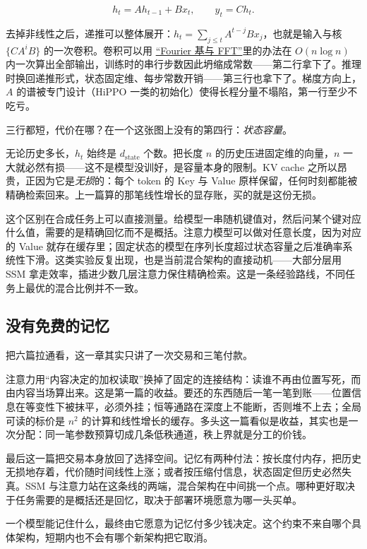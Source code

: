 \[
h_t = A h_{t-1} + B x_t,\qquad y_t = C h_t .
\]

去掉非线性之后，递推可以整体展开：\(h_t=\sum_{j\le t}A^{t-j}Bx_j\)，也就是输入与核 \(\{CA^{i}B\}\) 的一次卷积。卷积可以用 \hyperref[sec:03-Linear-Algebra/08-Complex-Matrices-and-Fourier-Structure/03]{``Fourier 基与 FFT''}里的办法在 \(O(n\log n)\) 内一次算出全部输出，训练时的串行步数因此坍缩成常数——第二行拿下了。推理时换回递推形式，状态固定维、每步常数开销——第三行也拿下了。梯度方向上，\(A\) 的谱被专门设计（HiPPO 一类的初始化）使得长程分量不塌陷，第一行至少不吃亏。

三行都短，代价在哪？在一个这张图上没有的第四行：\emph{状态容量}。

无论历史多长，\(h_t\) 始终是 \(d_{\text{state}}\) 个数。把长度 \(n\) 的历史压进固定维的向量，\(n\) 一大就必然有损——这不是模型没训好，是容量本身的限制。KV cache 之所以昂贵，正因为它是\emph{无损}的：每个 token 的 Key 与 Value 原样保留，任何时刻都能被精确检索回来。上一篇算的那笔线性增长的显存账，买的就是这份无损。

这个区别在合成任务上可以直接测量。给模型一串随机键值对，然后问某个键对应什么值，需要的是精确回忆而不是概括。注意力模型可以做对任意长度，因为对应的 Value 就存在缓存里；固定状态的模型在序列长度超过状态容量之后准确率系统性下滑。这类实验反复出现，也是当前混合架构的直接动机——大部分层用 SSM 拿走效率，插进少数几层注意力保住精确检索。这是一条经验路线，不同任务上最优的混合比例并不一致。

\subsection{没有免费的记忆}

把六篇拉通看，这一章其实只讲了一次交易和三笔付款。

注意力用``内容决定的加权读取''换掉了固定的连接结构：读谁不再由位置写死，而由内容当场算出来。这是第一篇的收益。要还的东西随后一笔一笔到账——位置信息在等变性下被抹平，必须外挂；恒等通路在深度上不能断，否则堆不上去；全局可读的标价是 \(n^2\) 的计算和线性增长的缓存。多头这一篇看似是收益，其实也是一次分配：同一笔参数预算切成几条低秩通道，秩上界就是分工的价钱。

最后这一篇把交易本身放回了选择空间。记忆有两种付法：按长度付内存，把历史无损地存着，代价随时间线性上涨；或者按压缩付信息，状态固定但历史必然失真。SSM 与注意力站在这条线的两端，混合架构在中间挑一个点。哪种更好取决于任务需要的是概括还是回忆，取决于部署环境愿意为哪一头买单。

一个模型能记住什么，最终由它愿意为记忆付多少钱决定。这个约束不来自哪个具体架构，短期内也不会有哪个新架构把它取消。
